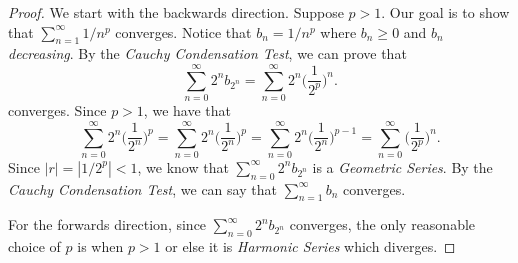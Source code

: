 \begin{proof}
    We start with the backwards direction. Suppose \( p > 1 \). Our goal is to show that \( \sum_{n=1}^{\infty} 1/n^p\) converges. Notice that \( b_n = 1/n^p\) where \( b_n \geq 0 \) and \( b_n \)
\textit{decreasing}. By the \textit{Cauchy Condensation Test}, we can prove that 
\[ \sum_{n=0}^{\infty} 2^n b_{2^n} = \sum_{n=0}^{\infty} 2^n \Big( \frac{1}{2^p}\Big)^n.\]
converges. Since \( p > 1 \), we have that 
\[ \sum_{n=0}^{\infty} 2^n \Big( \frac{1}{2^n}\Big)^p = \sum_{n=0}^{\infty} 2^n \Big( \frac{1}{2^n}\Big)^p = \sum_{n=0}^{\infty} 2^n \Big( \frac{1}{2^n}\Big)^{p-1} = \sum_{n=0}^{\infty} \Big(\frac{1}{2^p} \Big)^n.\]
Since \( |r| = |1/2^p| < 1 \), we know that \( \sum_{n=0}^{\infty}2^n b_{2^n}\) is a \textit{Geometric Series}. By the \textit{Cauchy Condensation Test}, we can say that \( \sum_{n=1}^{\infty} b_n \) converges. 

For the forwards direction, since  \(\sum_{n=0}^{\infty} 2^n b_{2^n}\) converges, the only reasonable choice of \( p \) is when \( p > 1 \) or else it is \textit{Harmonic Series} which diverges.
\end{proof}

